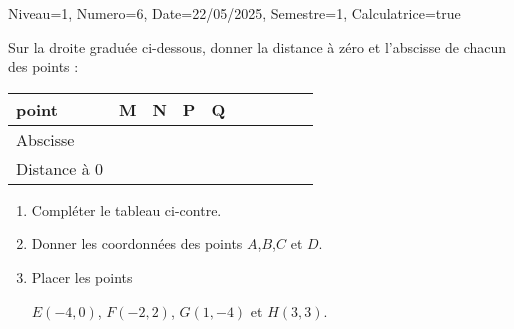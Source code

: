 \documentclass[a4paper,12pt]{article}
\begin{document}
\begin{Maquette}[DS]{Niveau=1, Numero=6, Date=22/05/2025, Semestre=1, Calculatrice=true}


\begin{exercice}[BaremeDetaille]
\begin{minipage}{0.6\linewidth}
Sur la droite graduée ci-dessous, donner la distance à zéro et l’abscisse de chacun des points   :

\end{minipage}\hfill
\begin{minipage}{.36\linewidth}
\begin{tabular}{|*5{Oc|}}
\hline 
point & M & N & P & Q \\ 
\hline 
Abscisse &  &  &  &  \\ 
\hline 
Distance à 0 &  &  &  &  \\ 
\hline 
\end{tabular} 
\end{minipage}
\begin{minipage}{.4\linewidth}
\begin{enumerate}
\item{} Compléter le tableau ci-contre.
\item{} Donner les coordonnées des points $A$,$B$,$C$ et $D$.
\par
\anserline[2]
\item{} Placer les points\par
 $E(-4, 0)$, $F(-2, 2)$, $G(1, -4)$ et $H(3, 3)$.
\end{enumerate}
\end{minipage}\hfill
\begin{minipage}{0.58\linewidth}
\begin{AffRepere}
\tkzSetUpPoint[shape=cross out,size=5]
\end{AffRepere}
\end{minipage}
\end{exercice}



\end{Maquette}
\end{document}
